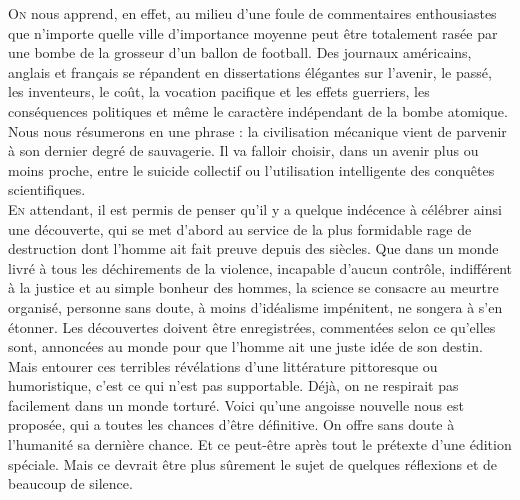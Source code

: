 \begin{multicols}{2}

    \lettrine{\color{RoyalBlue}O\color{black}}n nous apprend, en effet, au
    milieu d'une foule de commentaires enthousiastes que n'importe quelle ville
    d'importance moyenne peut être totalement rasée par une bombe de la grosseur
    d'un ballon de football. Des journaux américains, anglais et français se
    répandent en dissertations élégantes sur l'avenir, le passé, les inventeurs,
    le coût, la vocation pacifique et les effets guerriers, les conséquences
    politiques et même le caractère indépendant de la bombe atomique.  Nous nous
    résumerons en une phrase : la civilisation mécanique vient de parvenir à son
    dernier degré de sauvagerie. Il va falloir choisir, dans un avenir plus ou
    moins proche, entre le suicide collectif ou l'utilisation intelligente des
    conquêtes scientifiques.\\


    \lettrine{\color{RoyalBlue}E\color{black}}n attendant, il est permis de penser
    qu'il y a quelque indécence à célébrer ainsi une découverte, qui se met d'abord
    au service de la plus formidable rage
    de destruction dont l'homme ait fait preuve depuis des siècles. Que dans un
    monde livré à tous les déchirements de la violence, incapable d'aucun contrôle,
    indifférent à la justice et au simple bonheur des hommes, la science se consacre
    au meurtre organisé, personne sans doute, à moins d'idéalisme impénitent, ne
    songera à s'en étonner.  Les découvertes doivent être enregistrées, commentées
    selon ce qu'elles sont, annoncées au monde pour que l'homme ait une juste idée
    de son destin. Mais entourer ces terribles révélations d'une littérature
    pittoresque ou humoristique, c'est ce qui n'est pas supportable. Déjà, on ne
    respirait pas facilement dans un monde torturé. Voici qu'une angoisse nouvelle
    nous est proposée, qui a toutes les chances d'être définitive. On offre sans
    doute à l'humanité sa dernière chance. Et ce peut-être après tout le prétexte
    d'une édition spéciale. Mais ce devrait être plus sûrement le sujet de quelques
    réflexions et de beaucoup de silence.\\



\end{multicols}
